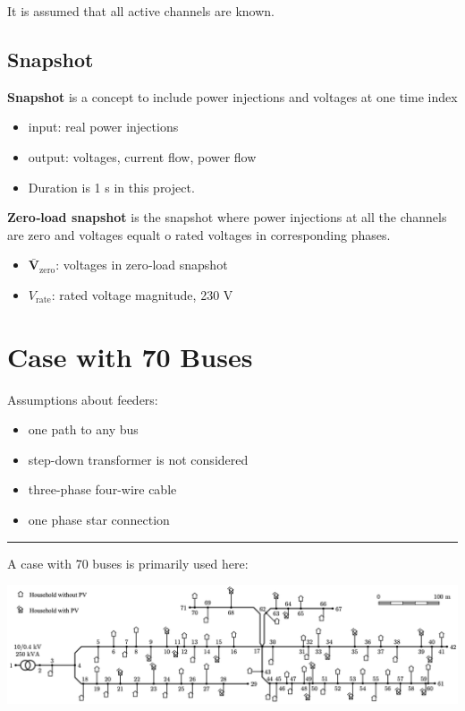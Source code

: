 \documentclass[
]{book}
\providecommand{\tightlist}{%
  \setlength{\itemsep}{0pt}\setlength{\parskip}{0pt}}
\begin{document}
It is assumed that all active channels are known.

\hypertarget{snapshot}{%
\subsection*{Snapshot}\label{snapshot}}

\textbf{Snapshot} is a concept to include power injections and voltages at one time
index

\begin{itemize}
\tightlist
\item
  input: real power injections
\item
  output: voltages, current flow, power flow
\item
  Duration is 1 s in this project.
\end{itemize}

\textbf{Zero‐load snapshot} is the snapshot where power injections at all the
channels are zero and voltages equalt o rated voltages in corresponding phases.

\begin{itemize}
\tightlist
\item
  \(\boldsymbol{\bar{V}}_\text{zero}\): voltages in zero‐load snapshot
\item
  \(V_\text{rate}\): rated voltage magnitude, 230 V
\end{itemize}

\hypertarget{case}{%
\section{Case with 70 Buses}\label{case}}

Assumptions about feeders:

\begin{itemize}
\tightlist
\item
  one path to any bus
\item
  step-down transformer is not considered
\item
  three-phase four-wire cable
\item
  one phase star connection
\end{itemize}

\begin{center}\rule{0.5\linewidth}{0.5pt}\end{center}

A case with 70 buses is primarily used here:

\includegraphics{Pictures/case70true.png}
\end{document}
